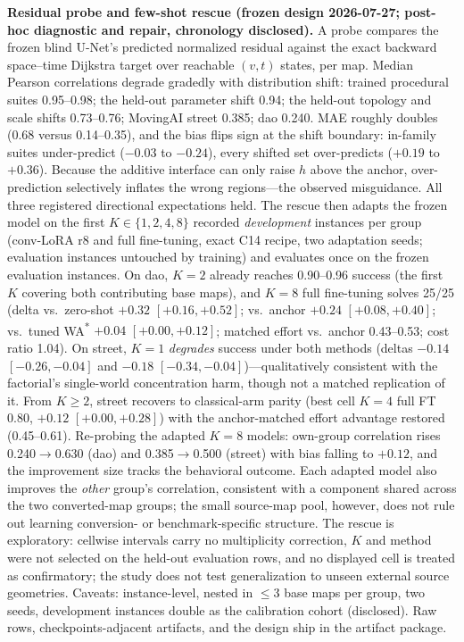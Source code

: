 \documentclass[letterpaper]{article} %
\begin{document}
\textbf{Residual probe and few-shot rescue (frozen design 2026-07-27; post-hoc diagnostic and repair, chronology disclosed).} A probe compares the frozen blind U-Net's predicted normalized residual against the exact backward space--time Dijkstra target over reachable $(v,t)$ states, per map. Median Pearson correlations degrade gradedly with distribution shift: trained procedural suites 0.95--0.98; the held-out parameter shift 0.94; the held-out topology and scale shifts 0.73--0.76; MovingAI street 0.385; dao 0.240. MAE roughly doubles (0.68 versus 0.14--0.35), and the bias flips sign at the shift boundary: in-family suites under-predict ($-0.03$ to $-0.24$), every shifted set over-predicts ($+0.19$ to $+0.36$). Because the additive interface can only raise $h$ above the anchor, over-prediction selectively inflates the wrong regions---the observed misguidance. All three registered directional expectations held. The rescue then adapts the frozen model on the first $K \in \{1,2,4,8\}$ recorded \emph{development} instances per group (conv-LoRA r8 and full fine-tuning, exact C14 recipe, two adaptation seeds; evaluation instances untouched by training) and evaluates once on the frozen evaluation instances. On dao, $K{=}2$ already reaches 0.90--0.96 success (the first $K$ covering both contributing base maps), and $K{=}8$ full fine-tuning solves 25/25 (delta vs.\ zero-shot $+0.32$ $[+0.16,+0.52]$; vs.\ anchor $+0.24$ $[+0.08,+0.40]$; vs.\ tuned WA\textsuperscript{*} $+0.04$ $[+0.00,+0.12]$; matched effort vs.\ anchor 0.43--0.53; cost ratio 1.04). On street, $K{=}1$ \emph{degrades} success under both methods (deltas $-0.14$ $[-0.26,-0.04]$ and $-0.18$ $[-0.34,-0.04]$)---qualitatively consistent with the factorial's single-world concentration harm, though not a matched replication of it. From $K \geq 2$, street recovers to classical-arm parity (best cell $K{=}4$ full FT 0.80, $+0.12$ $[+0.00,+0.28]$) with the anchor-matched effort advantage restored (0.45--0.61). Re-probing the adapted $K{=}8$ models: own-group correlation rises 0.240$\to$0.630 (dao) and 0.385$\to$0.500 (street) with bias falling to $+0.12$, and the improvement size tracks the behavioral outcome. Each adapted model also improves the \emph{other} group's correlation, consistent with a component shared across the two converted-map groups; the small source-map pool, however, does not rule out learning conversion- or benchmark-specific structure. The rescue is exploratory: cellwise intervals carry no multiplicity correction, $K$ and method were not selected on the held-out evaluation rows, and no displayed cell is treated as confirmatory; the study does not test generalization to unseen external source geometries. Caveats: instance-level, nested in $\leq$3 base maps per group, two seeds, development instances double as the calibration cohort (disclosed). Raw rows, checkpoints-adjacent artifacts, and the design ship in the artifact package.
\end{document}
